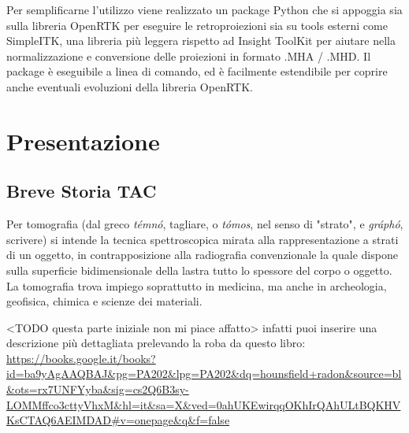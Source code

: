 \documentclass[a4paper,12pt, doubleside]{report}
\begin{document}
        \par
            Per semplificarne l'utilizzo viene realizzato un package Python che si appoggia sia sulla libreria OpenRTK per eseguire le retroproiezioni sia su tools esterni come SimpleITK, una libreria più leggera rispetto ad Insight ToolKit per aiutare nella normalizzazione e conversione delle proiezioni in formato .MHA / .MHD.
            Il package è eseguibile a linea di comando, ed è facilmente estendibile per coprire anche eventuali evoluzioni della libreria OpenRTK.
    
        \par
            [TODO nella sezione X si fa Y etc bla di blabla, il secondo di blabla]
    
    \newpage
    \tableofcontents
    \newpage
    \chapter{Presentazione}
        \section{Breve Storia TAC}
            \par
                Per tomografia (dal greco \textit{témnó}, tagliare, o \textit{tómos}, nel senso di "strato", e \textit{gráphó}, scrivere) si intende la tecnica spettroscopica mirata alla rappresentazione a strati di un oggetto, in contrapposizione alla radiografia convenzionale la quale dispone sulla superficie bidimensionale della lastra tutto lo spessore del corpo o oggetto.\\
                La tomografia trova impiego soprattutto in medicina, ma anche in archeologia, geofisica, chimica e scienze dei materiali.
                
                <TODO questa parte iniziale non mi piace affatto>
                infatti puoi inserire una descrizione più dettagliata prelevando la roba da questo libro:
                \url{https://books.google.it/books?id=ba9yAgAAQBAJ&pg=PA202&lpg=PA202&dq=hounsfield+radon&source=bl&ots=rx7UNFYyba&sig=cs2Q6B3sy-LOMMffco3cttyVhxM&hl=it&sa=X&ved=0ahUKEwirqqOKhIrQAhULtBQKHVKsCTAQ6AEIMDAD#v=onepage&q&f=false}
                
               
\end{document}
